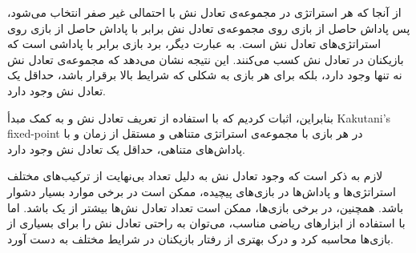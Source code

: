 از آنجا که هر استراتژی در مجموعه‌ی تعادل نش با احتمالی غیر صفر انتخاب می‌شود، پس پاداش حاصل از بازی روی مجموعه‌ی تعادل نش برابر با پاداش حاصل از بازی روی استراتژی‌های تعادل نش است. به عبارت دیگر، برد بازی برابر با پاداشی است که بازیکنان در تعادل نش کسب می‌کنند. این نتیجه نشان می‌دهد که مجموعه‌ی تعادل نش نه تنها وجود دارد، بلکه برای هر بازی به شکلی که شرایط بالا برقرار باشد، حداقل یک تعادل نش وجود دارد.

بنابراین، اثبات کردیم که با استفاده از تعریف تعادل نش و به کمک مبدأ Kakutani's fixed-point در هر بازی با مجموعه‌ی استراتژی متناهی و مستقل از زمان و با پاداش‌های متناهی، حداقل یک تعادل نش وجود دارد.

لازم به ذکر است که وجود تعادل نش به دلیل تعداد بی‌نهایت از ترکیب‌های مختلف استراتژی‌ها و پاداش‌ها در بازی‌های پیچیده، ممکن است در برخی موارد بسیار دشوار باشد. همچنین، در برخی بازی‌ها، ممکن است تعداد تعادل نش‌ها بیشتر از یک باشد. اما با استفاده از ابزارهای ریاضی مناسب، می‌توان به راحتی تعادل نش را برای بسیاری از بازی‌ها محاسبه کرد و درک بهتری از رفتار بازیکنان در شرایط مختلف به دست آورد.


